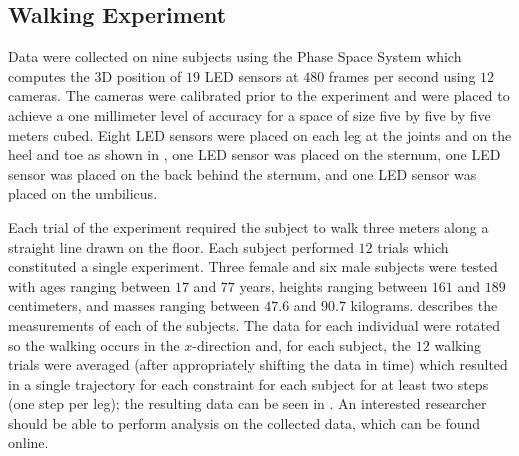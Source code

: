 \subsection{Walking Experiment} Data were collected on nine subjects using the Phase Space System\cite{phasespace}\xspace which computes the 3D position of $19$ LED sensors at $480$ frames per second using $12$ cameras. The cameras were calibrated prior to the experiment and were placed to achieve a one millimeter level of accuracy for a space of size five by five by five meters cubed. Eight LED sensors were placed on each leg at the joints and on the heel and toe as shown in , one LED sensor was placed on the sternum, one LED sensor was placed on the back behind the sternum, and one LED sensor was placed on the umbilicus.

Each trial of the experiment required the subject to walk three meters along a straight line drawn on the floor. Each subject performed $12$ trials which constituted a single experiment. Three female and six male subjects were tested with ages ranging between $17$ and $77$ years, heights ranging between $161$ and $189$ centimeters, and masses ranging between $47.6$ and $90.7$ kilograms.  describes the measurements of each of the subjects. The data for each individual were rotated so the walking occurs in the $x$-direction and, for each subject, the $12$ walking trials were averaged (after appropriately shifting the data in time) which resulted in a single trajectory for each constraint for each subject for at least two steps (one step per leg); the resulting data can be seen in . An interested researcher should be able to perform analysis on the collected data, which can be found online.\cite{ourdataset}


